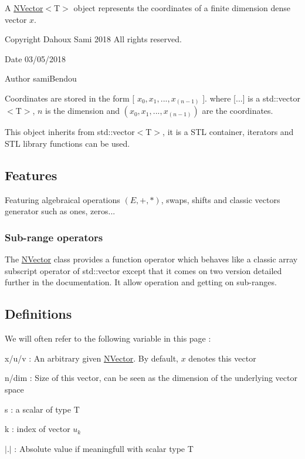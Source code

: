 A {\ttfamily \mbox{\hyperlink{class_n_vector}{N\+Vector}}$<$T$>$} object represents the coordinates of a finite dimension dense vector $ x $. 

\begin{DoxyCopyright}{Copyright}
Dahoux Sami 2018 All rights reserved. 
\end{DoxyCopyright}
\begin{DoxyDate}{Date}
03/05/2018 
\end{DoxyDate}
\begin{DoxyAuthor}{Author}
sami\+Bendou
\end{DoxyAuthor}
Coordinates are stored in the form {\ttfamily \mbox{[}} $ x_0, x_1, ..., x_{(n-1)} $ {\ttfamily \mbox{]}}. where {\ttfamily \mbox{[}...\mbox{]}} is a {\ttfamily std\+::vector$<$T$>$}, $ n $ is the dimension and $ (x_0, x_1, ..., x_{(n-1)}) $ are the coordinates.

This object inherits from {\ttfamily std\+::vector$<$T$>$}, it is a S\+TL container, iterators and S\+TL library functions can be used.\hypertarget{class_n_vector_Features}{}\subsection{Features}\label{class_n_vector_Features}
Featuring algebraical operations $ (E, +, *) $, swaps, shifts and classic vectors generator such as ones, zeros...\hypertarget{class_n_vector_FuncOpVec}{}\subsubsection{Sub-\/range operators}\label{class_n_vector_FuncOpVec}
The {\ttfamily \mbox{\hyperlink{class_n_vector}{N\+Vector}}} class provides a function operator which behaves like a classic array subscript operator of {\ttfamily std\+::vector} except that it comes on two version detailed further in the documentation. It allow operation and getting on sub-\/ranges.\hypertarget{class_n_vector_Definitions}{}\subsection{Definitions}\label{class_n_vector_Definitions}
We will often refer to the following variable in this page \+:
\begin{DoxyItemize}
\item {\ttfamily x}/{\ttfamily u}/{\ttfamily v} \+: An arbitrary given \mbox{\hyperlink{class_n_vector}{N\+Vector}}. By default, $ x $ denotes {\ttfamily this} vector
\item {\ttfamily n}/{\ttfamily dim} \+: Size of this vector, can be seen as the dimension of the underlying vector space
\item {\ttfamily s} \+: a scalar of type {\ttfamily T}
\item {\ttfamily k} \+: index of vector $ u_k $
\item $ |.| $ \+: Absolute value if meaningfull with scalar type {\ttfamily T} 
\end{DoxyItemize}

